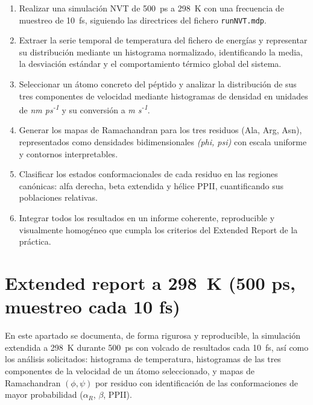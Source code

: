 \documentclass[12pt,a4paper]{article}
\begin{document}
\begin{enumerate}
    \item Realizar una simulación NVT de \SI{500}{ps} a \SI{298}{K} con una frecuencia de muestreo de \SI{10}{fs}, siguiendo las directrices del fichero \texttt{runNVT.mdp}.
    
    \item Extraer la serie temporal de temperatura del fichero de energías y representar su distribución mediante un histograma normalizado, identificando la media, la desviación estándar y el comportamiento térmico global del sistema.
    
    \item Seleccionar un átomo concreto del péptido y analizar la distribución de sus tres componentes de velocidad mediante histogramas de densidad en unidades de \textit{nm ps\textsuperscript{-1}} y su conversión a \textit{m s\textsuperscript{-1}}.
    
    \item Generar los mapas de Ramachandran para los tres residuos (Ala, Arg, Asn), representados como densidades bidimensionales \textit{(phi, psi)} con escala uniforme y contornos interpretables.
    
    \item Clasificar los estados conformacionales de cada residuo en las regiones canónicas: alfa derecha, beta extendida y hélice PPII, cuantificando sus poblaciones relativas.
    
    \item Integrar todos los resultados en un informe coherente, reproducible y visualmente homogéneo que cumpla los criterios del Extended Report de la práctica.
\end{enumerate}

\section{Extended report a \texorpdfstring{\SI{298}{K}}{298 K} (500 ps, muestreo cada 10 fs)}
\label{sec:extended-298K}

\noindent
En este apartado se documenta, de forma rigurosa y reproducible, la simulación extendida a \SI{298}{K} durante \SI{500}{ps} con volcado de resultados cada \SI{10}{fs}, así como los análisis solicitados: histograma de temperatura, histogramas de las tres componentes de la velocidad de un átomo seleccionado, y mapas de Ramachandran \texorpdfstring{$(\phi,\psi)$}{(phi,psi)} por residuo con identificación de las conformaciones de mayor probabilidad (\texorpdfstring{$\alpha_R$}{alphaR}, \texorpdfstring{$\beta$}{beta}, PPII).
\end{document}
